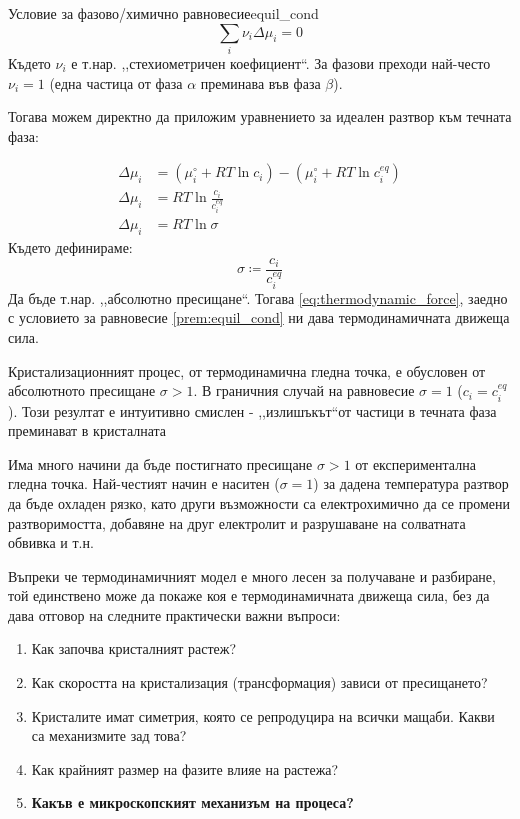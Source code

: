 \begin{premise}{Условие за фазово/химично равновесие}{equil_cond}
	\[\sum\limits_i \nu_i\Delta \mu_i  = 0\]
	Където $\nu_i$ е т.нар. ,,стехиометричен коефициент``. За фазови преходи най-често $\nu_i = 1$ (една частица от фаза $\alpha$ преминава във фаза $\beta$).
\end{premise}

\noindent Тогава можем директно да приложим уравнението за идеален разтвор към течната фаза:

\begin{align}
	\Delta \mu_{i} & = \left( \mu_{i}^\circ + RT\ln{c_i} \right) - \left( \mu_{i}^\circ + RT\ln{c_{i}^{eq}} \right) \nonumber \\
	\Delta \mu_{i} & = RT\ln{\frac{c_i}{c_{i}^{eq}}} \nonumber                                                                \\
	\Delta \mu_{i} & = RT\ln{\sigma} \label{eq:thermodynamic_force}                                                           
\end{align}
Където дефинираме:
\begin{equation}
	\label{eq:abs_supersat}
	\sigma \coloneqq \frac{c_{i}}{c_{i}^{eq}}
\end{equation}
Да бъде т.нар. ,,абсолютно пресищане``. Тогава \autoref{eq:thermodynamic_force}, заедно с условието за равновесие \autoref{prem:equil_cond} ни дава термодинамичната движеща сила.

Кристализационният процес, от термодинамична гледна точка, е обусловен от абсолютното пресищане $\sigma > 1$. В граничния случай на равновесие $\sigma = 1$ ($c_{i}  = c_{i}^{eq}$). Този резултат е интуитивно смислен - ,,излишъкът``от частици в течната фаза преминават в кристалната \cite{IvanMarkovCGB}

Има много начини да бъде постигнато пресищане $\sigma > 1$ от експериментална гледна точка. Най-честият начин е наситен ($\sigma = 1$) за дадена температура разтвор да бъде охладен рязко, като други възможности са електрохимично да се промени разтворимостта, добавяне на друг електролит и разрушаване на солватната обвивка и т.н. 

Въпреки че термодинамичният модел е много лесен за получаване и разбиране, той единствено може да покаже коя е термодинамичната движеща сила, без да дава отговор на следните практически важни въпроси:
\begin{enumerate}
	\item Как започва кристалният растеж?
	\item Как скоростта на кристализация (трансформация) зависи от пресищането?
	\item Кристалите имат симетрия, която се репродуцира на всички мащаби. Какви са механизмите зад това?
	\item Как крайният размер на фазите влияе на растежа?
	\item \textbf{Какъв е микроскопският механизъм на процеса?}
\end{enumerate}

